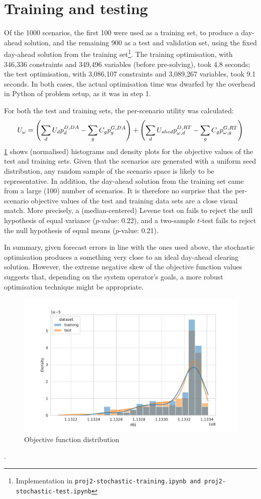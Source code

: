 \documentclass[11pt,a4paper]{article}
\numberwithin{equation}{section}
\begin{document}
\section{Training and testing}

Of the 1000 scenarios, the first 100 were used as a training set, to produce a day-ahead solution, and the remaining 900 as a test and validation set, using the fixed day-ahead solution from the training set\footnote{Implementation in \tt{proj2-stochastic-training.ipynb} and \tt{proj2-stochastic-test.ipynb}}.
The training optimisation, with 346,336 constraints and 349,496 variables (before pre-solving), took 4.8 seconds; the test optimisation, with 3,086,107 constraints and 3,089,267 variables, took 9.1 seconds.
In both cases, the actual optimisation time was dwarfed by the overhead in Python of problem setup, as it was in step 1.

For both the test and training sets, the per-scenario utility was calculated:
\begin{equation}
U_\omega = \left( \sum_d U_d p^{D,DA}_d - \sum_g C_g p^{G,DA}_g \right) + \left( \sum_d U_{shed} p^{D,RT}_{\omega,d} - \sum_g C_g p^{G,RT}_{\omega,g} \right)
\end{equation}
\cref{fig:obj_dist} shows (normalised) histograms and density plots for the objective values of the test and training sets.
Given that the scenarios are generated with a uniform seed distribution, any random sample of the scenario space is likely to be representative.
In addition, the day-ahead solution from the training set came from a large (100) number of scenarios.
It is therefore no surprise that the per-scenario objective values of the test and training data sets are a close visual match.
More precisely, a (median-centered) Levene test on fails to reject the null hypothesis of equal variance ($p$-value: 0.22), and a two-sample $t$-test fails to reject the null hypothesis of equal means ($p$-value: 0.21).

In summary, given forecast errors in line with the ones used above, the stochastic optimisation produces a something very close to an ideal day-ahead clearing solution.
However, the extreme negative skew of the objective function values suggests that, depending on the system operator's goals, a more robust optimisation technique might be appropriate.

\begin{figure}[htbp]
\centering
\includegraphics[width=\textwidth]{../output/obj_distribution.pdf}
\caption{Objective function distribution}
\label{fig:obj_dist}
\end{figure}

\renewcommand{\refname}{\section{References}}.

\end{document}
